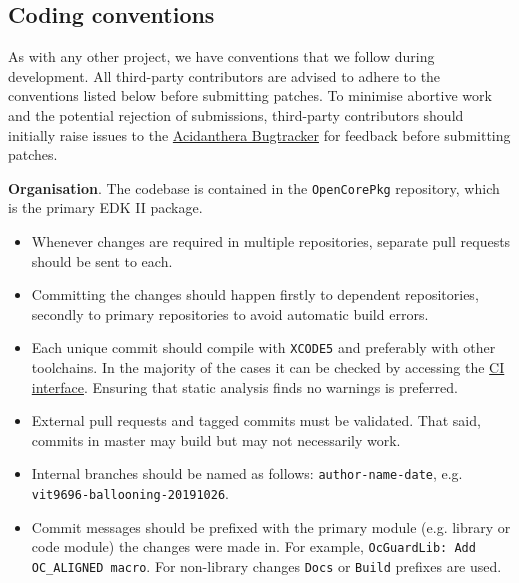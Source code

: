 \documentclass[]{article}
\makeatletter
\providecommand{\tightlist}{%
  \setlength{\itemsep}{0pt}\setlength{\parskip}{0pt}}
\renewcommand{\label}[1]{%
\zref@wrapper@immediate{\oldlabel{#1}}}  %
\makeatother
\begin{document}
\subsection{Coding conventions}\label{configuration-conv}

As with any other project, we have conventions that we follow during development.
All third-party contributors are advised to adhere to the conventions listed below
before submitting patches. To minimise abortive work and the potential rejection of
submissions, third-party contributors should initially raise issues to the
\href{https://github.com/acidanthera/bugtracker}{Acidanthera Bugtracker}
for feedback before submitting patches.

\textbf{Organisation}. The codebase is contained in the \texttt{OpenCorePkg} repository,
which is the primary EDK II package.
\begin{itemize}
\tightlist
\item Whenever changes are required in multiple repositories, separate pull requests should
be sent to each.
\item Committing the changes should happen firstly to dependent repositories, secondly to
primary repositories to avoid automatic build errors.
\item Each unique commit should compile with \texttt{XCODE5} and preferably with other
toolchains. In the majority of the cases it can be checked by accessing the
\href{https://travis-ci.com/acidanthera}{CI interface}. Ensuring that static analysis finds
no warnings is preferred.
\item External pull requests and tagged commits must be validated. That said, commits in
master may build but may not necessarily work.
\item Internal branches should be named as follows: \texttt{author-name-date}, e.g.
\texttt{vit9696-ballooning-20191026}.
\item Commit messages should be prefixed with the primary module (e.g. library or code module) the
changes were made in. For example, \texttt{OcGuardLib: Add OC\_ALIGNED macro}. For non-library changes
\texttt{Docs} or \texttt{Build} prefixes are used.
\end{itemize}
\end{document}
